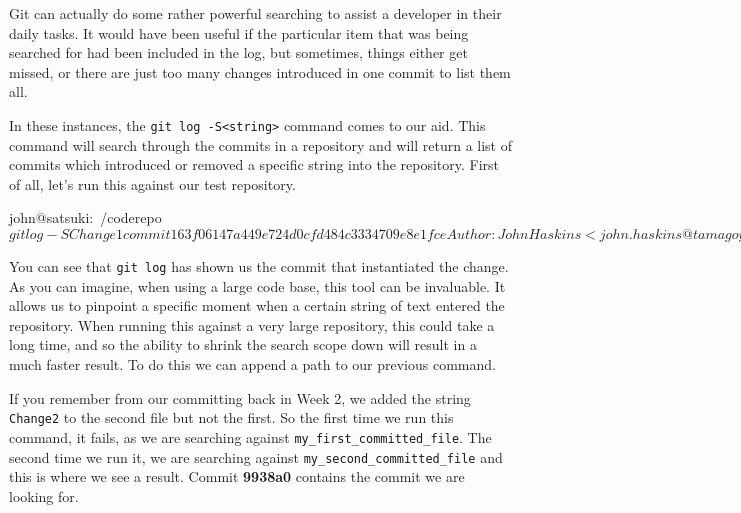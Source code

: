Git can actually do some rather powerful searching to assist a developer in their daily tasks.  It would have been useful if the particular item that was being searched for had been included in the log, but sometimes, things either get missed, or there are just too many changes introduced in one commit to list them all.

In these instances, the \texttt{git log -S<string>} command comes to our aid.  This command will search through the commits in a repository and will return a list of commits which introduced or removed a specific string into the repository.  First of all, let's run this against our test repository.

\begin{code}
john@satsuki:~/coderepo$ git log -SChange1
commit 163f06147a449e724d0cfd484c3334709e8e1fce
Author: John Haskins <john.haskins@tamagoyakiinc.koala>
Date:   Thu Mar 31 20:32:59 2011 +0100

    Made a few changes to first and second files
john@satsuki:~/coderepo$ 
\end{code}

You can see that \texttt{git log} has shown us the commit that instantiated the change.  As you can imagine, when using a large code base, this tool can be invaluable.  It allows us to pinpoint a specific moment when a certain string of text entered the repository.  When running this against a very large repository, this could take a long time, and so the ability to shrink the search scope down will result in a much faster result.  To do this we can append a path to our previous command.  


If you remember from our committing back in Week 2, we added the string \texttt{Change2} to the second file but not the first.  So the first time we run this command, it fails, as we are searching against \texttt{my\_first\_committed\_file}.  The second time we run it, we are searching against \texttt{my\_second\_committed\_file} and this is where we see a result.  Commit \textbf{9938a0} contains the commit we are looking for.

